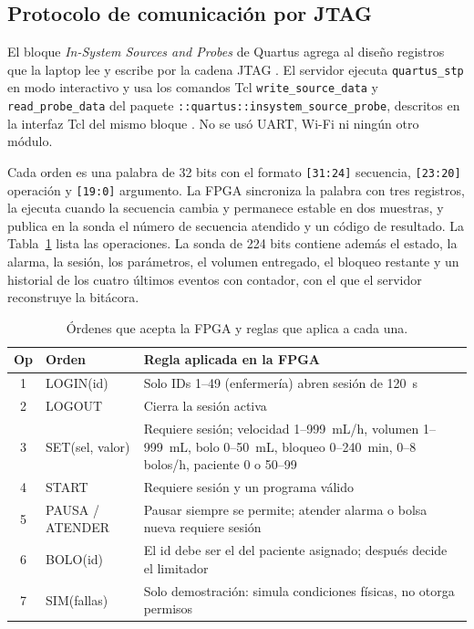 \documentclass[11pt,letterpaper]{article}
\newcommand{\code}[1]{\texttt{#1}}
\begin{document}
\subsection{Protocolo de comunicación por JTAG}\label{sec:jtag}
El bloque \emph{In-System Sources and Probes} de Quartus agrega al diseño registros que la laptop lee y escribe por la cadena JTAG \cite{issp,jtag}. El servidor ejecuta \code{quartus\_stp} en modo interactivo y usa los comandos Tcl \code{write\_source\_data} y \code{read\_probe\_data} del paquete \code{::quartus::insystem\_source\_probe}, descritos en la interfaz Tcl del mismo bloque \cite{issp}. No se usó UART, Wi-Fi ni ningún otro módulo.

Cada orden es una palabra de 32 bits con el formato \code{[31:24]} secuencia, \code{[23:20]} operación y \code{[19:0]} argumento. La FPGA sincroniza la palabra con tres registros, la ejecuta cuando la secuencia cambia y permanece estable en dos muestras, y publica en la sonda el número de secuencia atendido y un código de resultado. La Tabla~\ref{tab:ordenes} lista las operaciones. La sonda de 224 bits contiene además el estado, la alarma, la sesión, los parámetros, el volumen entregado, el bloqueo restante y un historial de los cuatro últimos eventos con contador, con el que el servidor reconstruye la bitácora.

\begin{table}[H]
\centering
\caption{Órdenes que acepta la FPGA y reglas que aplica a cada una.}
\label{tab:ordenes}
\begin{tabularx}{\linewidth}{clX}
\toprule
\textbf{Op} & \textbf{Orden} & \textbf{Regla aplicada en la FPGA} \\
\midrule
1 & LOGIN(id) & Solo IDs 1--49 (enfermería) abren sesión de 120~s \\
2 & LOGOUT & Cierra la sesión activa \\
3 & SET(sel, valor) & Requiere sesión; velocidad 1--999~mL/h, volumen 1--999~mL, bolo 0--50~mL, bloqueo 0--240~min, 0--8 bolos/h, paciente 0 o 50--99 \\
4 & START & Requiere sesión y un programa válido \\
5 & PAUSA / ATENDER & Pausar siempre se permite; atender alarma o bolsa nueva requiere sesión \\
6 & BOLO(id) & El id debe ser el del paciente asignado; después decide el limitador \\
7 & SIM(fallas) & Solo demostración: simula condiciones físicas, no otorga permisos \\
\bottomrule
\end{tabularx}
\end{table}
\end{document}
